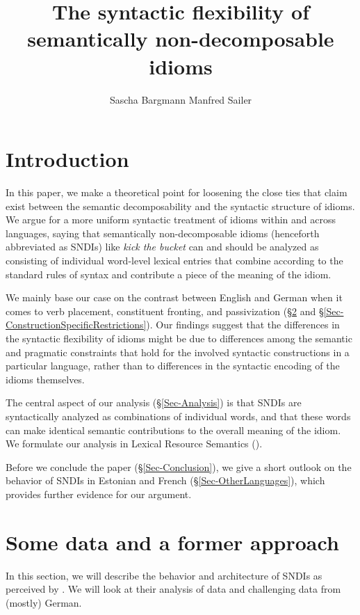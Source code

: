 \documentclass[output=paper]{langsci/langscibook}
\author{Sascha Bargmann\affiliation{Goethe University Frankfurt a.M., Germany}%
\lastand Manfred Sailer\affiliation{Goethe University Frankfurt/Main, Germany}}
\title{The syntactic flexibility of semantically non-decomposable idioms}
\begin{document}
\section{Introduction}\label{Sec-Introduction}

In this paper, we make a theoretical point for loosening the close ties that \cite{Nunberg1994} claim exist between the semantic decomposability and the syntactic structure of idioms. We argue for a more uniform syntactic treatment of idioms within and across languages, saying that  semantically non-decomposable idioms (henceforth abbreviated as SNDIs) like \textit{kick the bucket} can and should be analyzed as consisting of individual word-level lexical entries that combine according to the standard rules of syntax and contribute a piece of the meaning of the idiom.

We mainly base our case on the contrast between English and German when it comes to verb placement, constituent fronting, and passivization (§\ref{Sec-SyntacticSemanticFlexibility} and §\ref{Sec-ConstructionSpecificRestrictions}). Our findings suggest that the differences in the syntactic flexibility of idioms might be due to differences among the semantic and pragmatic constraints that hold for the involved syntactic constructions in a particular language, rather than to differences in the syntactic encoding of the idioms themselves.

The central aspect of our analysis (§\ref{Sec-Analysis}) is that SNDIs are syntactically analyzed as combinations of individual words, and that these words can make identical semantic contributions to the overall meaning of the idiom. We formulate our analysis in  Lexical Resource Semantics (\citealt{Richter:Sailer:04}).

Before we conclude the paper (§\ref{Sec-Conclusion}), we give a short outlook on the behavior of SNDIs in Estonian and French (§\ref{Sec-OtherLanguages}), which provides further evidence for our argument.



\section{Some data and a former approach}
\label{Sec-SyntacticSemanticFlexibility}

In this section, we will describe the behavior and architecture of SNDIs as perceived by \cite{Nunberg1994}. We will look at their analysis of  data and challenging data from (mostly) German.
\end{document}
